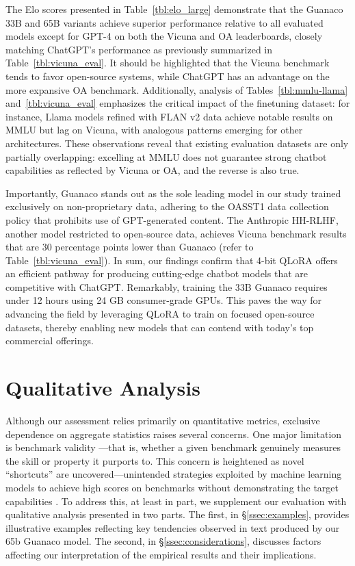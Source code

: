 The Elo scores presented in Table~\ref{tbl:elo_large} demonstrate that the {Guanaco} 33B and 65B variants achieve superior performance relative to all evaluated models except for GPT-4 on both the Vicuna and OA leaderboards, closely matching ChatGPT's performance as previously summarized in Table~\ref{tbl:vicuna_eval}. It should be highlighted that the Vicuna benchmark tends to favor open-source systems, while ChatGPT has an advantage on the more expansive OA benchmark. Additionally, analysis of Tables~\ref{tbl:mmlu-llama} and~\ref{tbl:vicuna_eval} emphasizes the critical impact of the finetuning dataset: for instance, Llama models refined with FLAN v2 data achieve notable results on MMLU but lag on Vicuna, with analogous patterns emerging for other architectures. These observations reveal that existing evaluation datasets are only partially overlapping: excelling at MMLU does not guarantee strong chatbot capabilities as reflected by Vicuna or OA, and the reverse is also true.

Importantly, {Guanaco} stands out as the sole leading model in our study trained exclusively on non-proprietary data, adhering to the OASST1 data collection policy that prohibits use of GPT-generated content. The Anthropic HH-RLHF, another model restricted to open-source data, achieves Vicuna benchmark results that are 30 percentage points lower than {Guanaco} (refer to Table~\ref{tbl:vicuna_eval}). In sum, our findings confirm that 4-bit \textsc{QLoRA} offers an efficient pathway for producing cutting-edge chatbot models that are competitive with ChatGPT. Remarkably, training the 33B {Guanaco} requires under 12 hours using 24 GB consumer-grade GPUs. This paves the way for advancing the field by leveraging \textsc{QLoRA} to train on focused open-source datasets, thereby enabling new models that can contend with today’s top commercial offerings.

\section{Qualitative Analysis}

Although our assessment relies primarily on quantitative metrics, exclusive dependence on aggregate statistics raises several concerns. One major limitation is benchmark validity \citep{liao2021we}—that is, whether a given benchmark genuinely measures the skill or property it purports to. This concern is heightened as novel ``shortcuts'' are uncovered—unintended strategies exploited by machine learning models to achieve high scores on benchmarks without demonstrating the target capabilities \citep{gururangan2018annotation, poliak2018hypothesis}. To address this, at least in part, we supplement our evaluation with qualitative analysis presented in two parts. The first, in \S\ref{ssec:examples}, provides illustrative examples reflecting key tendencies observed in text produced by our 65b {Guanaco} model. The second, in \S\ref{ssec:considerations}, discusses factors affecting our interpretation of the empirical results and their implications.

